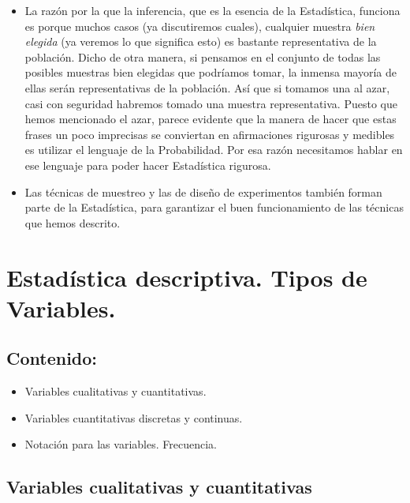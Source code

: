\begin{itemize}
    \item La razón por la que la inferencia, que es la esencia de la Estadística, funciona es porque muchos casos (ya discutiremos cuales), cualquier muestra {\em bien elegida} (ya veremos lo que significa esto) es bastante representativa de la población. Dicho de otra manera, si pensamos en el conjunto de todas las posibles muestras bien elegidas que podríamos tomar, la inmensa mayoría de ellas serán representativas de la población. Así que si tomamos una al azar, casi con seguridad habremos tomado una muestra representativa. Puesto que hemos mencionado el azar, parece evidente que la manera de hacer que estas frases un poco imprecisas se conviertan en afirmaciones rigurosas y medibles es utilizar el lenguaje de la {\sf Probabilidad}. Por esa razón necesitamos hablar en ese lenguaje para poder hacer Estadística rigurosa.

    \item Las técnicas de {\sf muestreo} y las de {\sf diseño de experimentos} también forman parte de la Estadística, para garantizar el buen funcionamiento de las técnicas que hemos descrito.


\end{itemize}

\section{Estadística descriptiva. Tipos de Variables.}

\subsection*{Contenido:}
\begin{itemize}
 \item Variables cualitativas y cuantitativas.
 \item Variables cuantitativas discretas y continuas.
 \item Notación para las variables. Frecuencia.
\end{itemize}


\subsection{Variables cualitativas y cuantitativas}

